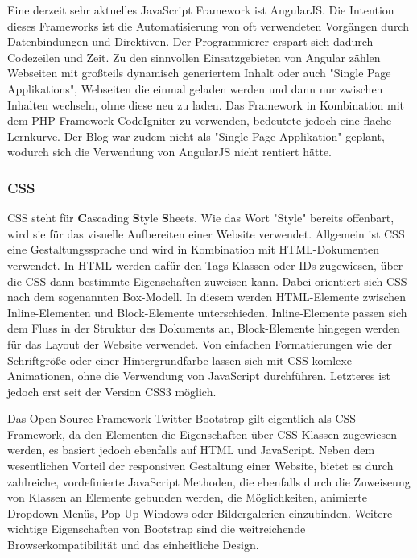       Eine derzeit sehr aktuelles JavaScript Framework ist {AngularJS\cite{angular}}. Die Intention dieses Frameworks ist die Automatisierung von oft verwendeten Vorgängen durch
      Datenbindungen und Direktiven. Der Programmierer erspart sich dadurch Codezeilen und Zeit. Zu den sinnvollen Einsatzgebieten von Angular zählen Webseiten mit großteils dynamisch generiertem
      Inhalt oder auch "Single Page Applikations", Webseiten die einmal geladen werden und dann nur zwischen Inhalten wechseln, ohne diese neu zu laden. Das Framework in Kombination mit dem PHP
      Framework CodeIgniter zu verwenden, bedeutete jedoch eine flache Lernkurve. Der Blog war zudem nicht als "Single Page Applikation" geplant, wodurch sich die Verwendung von AngularJS nicht rentiert hätte.

      \subsubsection*{CSS}
      {CSS\cite{css}} steht für \textbf{C}ascading \textbf{S}tyle \textbf{S}heets. Wie das Wort "Style" bereits offenbart, wird sie für das visuelle Aufbereiten einer Website verwendet.
      Allgemein ist CSS eine Gestaltungssprache und wird in Kombination mit HTML-Dokumenten verwendet. In HTML werden dafür den Tags Klassen oder IDs
      zugewiesen, über die CSS dann bestimmte Eigenschaften zuweisen kann. Dabei orientiert sich CSS nach dem sogenannten Box-Modell. In diesem werden HTML-Elemente
      zwischen Inline-Elementen und Block-Elemente unterschieden. Inline-Elemente passen sich dem Fluss in der Struktur des Dokuments an, Block-Elemente hingegen
      werden für das Layout der Website verwendet. Von einfachen Formatierungen wie der Schriftgröße oder einer Hintergrundfarbe lassen sich mit CSS komlexe Animationen,
      ohne die Verwendung von JavaScript durchführen. Letzteres ist jedoch erst seit der Version CSS3 möglich.

      Das Open-Source Framework {Twitter Bootstrap\cite{bootstrap}} gilt eigentlich als CSS-Framework, da den Elementen die Eigenschaften über CSS Klassen zugewiesen werden, es basiert jedoch
      ebenfalls auf HTML und JavaScript. Neben dem wesentlichen Vorteil der responsiven Gestaltung einer Website, bietet es durch
      zahlreiche, vordefinierte JavaScript Methoden, die ebenfalls durch die Zuweiseung von Klassen an Elemente gebunden werden, die Möglichkeiten, animierte Dropdown-Menüs, Pop-Up-Windows oder Bildergalerien einzubinden.
      Weitere wichtige Eigenschaften von Bootstrap sind die weitreichende Browserkompatibilität und das einheitliche Design.

